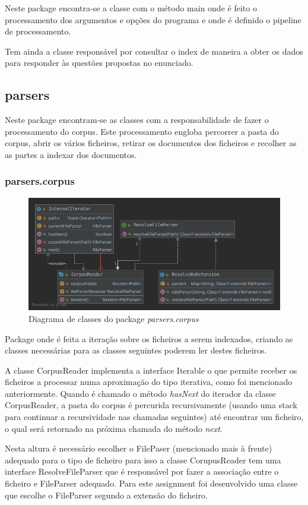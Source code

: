 \documentclass[12pt]{article}
\begin{document}
Neste package encontra-se a classe com o método main onde é feito o
processamento dos argumentos e opções do programa e onde é definido o
pipeline de processamento.

Tem ainda a classe responsável por consultar o index de maneira a
obter os dados para responder às questões propostas no enunciado.

\subsection{parsers}
Neste package encontram-se as classes com a responsabilidade de fazer
o processamento do corpus. Este processamento engloba percorrer a pasta do
corpus, abrir os vários ficheiros, retirar os documentos dos ficheiros e
recolher as as partes a indexar dos documentos.

\subsubsection{parsers.corpus}
\begin{figure}[h]
  \center
  \includegraphics[width=12cm]{packages_parsers_corpus.png}
  \caption{Diagrama de classes do package \it parsers.corpus}
\end{figure}

Package onde é feita a iteração sobre os ficheiros a serem indexados, criando as classes
necessárias para as classes seguintes poderem ler destes ficheiros.

A classe CorpusReader implementa a interface Iterable o que permite receber os ficheiros
a processar numa aproximação do tipo iterativa, como foi mencionado anteriormente. Quando
é chamado o método {\it hasNext} do iterador da classe CorpusReader, a pasta do corpus
é percurida recursivamente (usando uma stack para continuar a recursividade nas chamadas
seguintes) até encontrar um ficheiro, o qual será retornado na próxima chamada do método
{\it next}.

Nesta altura é necessário escolher o FilePaser (mencionado mais à frente) adequado para
o tipo de ficheiro para isso a classe CorupusReader tem uma interface ResolveFileParser
que é responsável por fazer a associação entre o ficheiro e FileParser adequado. Para este
assignment foi desenvolvido uma classe que escolhe o FileParser segundo a extensão do ficheiro.
\end{document}
